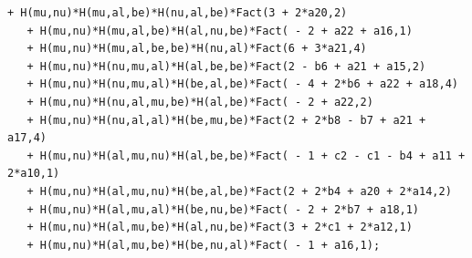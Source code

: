 \documentclass[aspectratio=169,usenames,dvipsnames]{beamer}
\begin{document}
\begin{frame}[t,fragile]
\begin{columns}
\begin{column}{\textwidth}
\begin{lrbox}{\myv}
\begin{minipage}{\textwidth}
\begin{Verbatim}[gobble=2,frame=single,framesep=2mm,label=The Total Lagrangian
For Triple Graviton Vertex,labelposition=all]
   + H(mu,nu)*H(mu,al,be)*H(nu,al,be)*Fact(3 + 2*a20,2)
   + H(mu,nu)*H(mu,al,be)*H(al,nu,be)*Fact( - 2 + a22 + a16,1)
   + H(mu,nu)*H(mu,al,be,be)*H(nu,al)*Fact(6 + 3*a21,4)
   + H(mu,nu)*H(nu,mu,al)*H(al,be,be)*Fact(2 - b6 + a21 + a15,2)
   + H(mu,nu)*H(nu,mu,al)*H(be,al,be)*Fact( - 4 + 2*b6 + a22 + a18,4)
   + H(mu,nu)*H(nu,al,mu,be)*H(al,be)*Fact( - 2 + a22,2)
   + H(mu,nu)*H(nu,al,al)*H(be,mu,be)*Fact(2 + 2*b8 - b7 + a21 + a17,4)
   + H(mu,nu)*H(al,mu,nu)*H(al,be,be)*Fact( - 1 + c2 - c1 - b4 + a11 + 2*a10,1)
   + H(mu,nu)*H(al,mu,nu)*H(be,al,be)*Fact(2 + 2*b4 + a20 + 2*a14,2)
   + H(mu,nu)*H(al,mu,al)*H(be,nu,be)*Fact( - 2 + 2*b7 + a18,1)
   + H(mu,nu)*H(al,mu,be)*H(al,nu,be)*Fact(3 + 2*c1 + 2*a12,1)
   + H(mu,nu)*H(al,mu,be)*H(be,nu,al)*Fact( - 1 + a16,1);
\end{Verbatim}
\end{minipage}\end{lrbox}
\resizebox{0.537\textwidth}{!}{\usebox\myv}
  \end{column}
\end{columns}

\vspace{100mm}
\end{frame}
\end{document}
